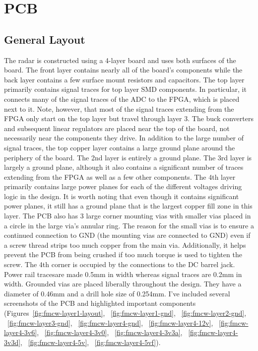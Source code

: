 \documentclass{default}
\begin{document}
\chapter{PCB}
\section{General Layout}

The radar is constructed using a 4-layer board and uses both surfaces of the board. The front layer
contains nearly all of the board's components while the back layer contains a few surface mount
resistors and capacitors. The top layer primarily contains signal traces for top layer SMD
components. In particular, it connects many of the signal traces of the ADC to the FPGA, which is
placed next to it. Note, however, that most of the signal traces extending from the FPGA only start
on the top layer but travel through layer 3. The buck converters and subsequent linear regulators
are placed near the top of the board, not necessarily near the components they drive. In addition to
the large number of signal traces, the top copper layer contains a large ground plane around the
periphery of the board. The 2nd layer is entirely a ground plane. The 3rd layer is largely a ground
plane, although it also contains a significant number of traces extending from the FPGA as well as a
few other components. The 4th layer primarily contains large power planes for each of the different
voltages driving logic in the design. It is worth noting that even though it contains significant
power planes, it still has a ground plane that is the largest copper fill zone in this layer. The
PCB also has 3 large corner mounting vias with smaller vias placed in a circle in the large via's
annular ring. The reason for the small vias is to ensure a continued connection to GND (the mounting
vias are connected to GND) even if a screw thread strips too much copper from the main
via. Additionally, it helps prevent the PCB from being crushed if too much torque is used to tighten
the screw. The 4th corner is occupied by the connections to the DC barrel jack. Power rail tracesare
made 0.5mm in width whereas signal traces are 0.2mm in width. Grounded vias are placed liberally
throughout the design. They have a diameter of 0.46mm and a drill hole size of 0.254mm. I've included
several screenshots of the PCB and highlighted important
components (Figures~\ref{fig:fmcw-layer1-layout}, ~\ref{fig:fmcw-layer1-gnd},
~\ref{fig:fmcw-layer2-gnd}, ~\ref{fig:fmcw-layer3-gnd}, ~\ref{fig:fmcw-layer4-gnd},
~\ref{fig:fmcw-layer4-12v}, ~\ref{fig:fmcw-layer4-3v6}, ~\ref{fig:fmcw-layer4-3v0},
~\ref{fig:fmcw-layer4-3v3a}, ~\ref{fig:fmcw-layer4-3v3d}, ~\ref{fig:fmcw-layer4-5v},
~\ref{fig:fmcw-layer4-5vf}).
\end{document}
